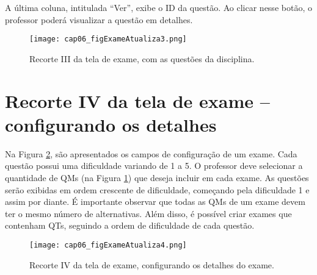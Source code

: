 A última coluna, intitulada ``Ver'', exibe o ID da questão. Ao clicar nesse botão, o professor poderá visualizar a questão em detalhes.

\begin{figure}[!t]
  \centering
  \texttt{[image: cap06\_figExameAtualiza3.png]}
  \caption{Recorte III da tela de exame, com as questões da disciplina.}
  \label{fig:cap06_figExameAtualiza3}\vspace{-3mm}
\end{figure}

\section{Recorte IV da tela de exame -- configurando os detalhes}\label{sec:exameDetalhes}

Na Figura \ref{fig:cap06_figExameAtualiza4}, são apresentados os campos de configuração de um exame. Cada questão possui uma dificuldade variando de 1 a 5. O professor deve selecionar a quantidade de QMs (na Figura \ref{fig:cap06_figExameAtualiza3}) que deseja incluir em cada exame. As questões serão exibidas em ordem crescente de dificuldade, começando pela dificuldade 1 e assim por diante. É importante observar que todas as QMs de um exame devem ter o mesmo número de alternativas. Além disso, é possível criar exames que contenham QTs, seguindo a ordem de dificuldade de cada questão.


\begin{figure}[!t]
  \centering
  \texttt{[image: cap06\_figExameAtualiza4.png]}
  \caption{Recorte IV da tela de exame, configurando os detalhes do exame.}
  \label{fig:cap06_figExameAtualiza4}\vspace{-3mm}
\end{figure}



